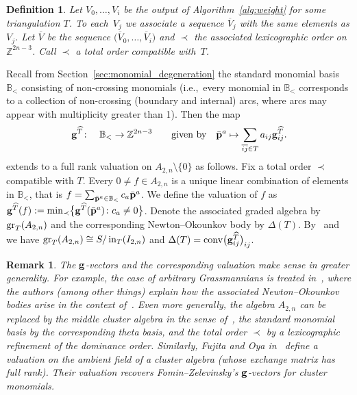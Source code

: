 \documentclass[pdftex]{sigma}%
\newtheorem{Definition}[Theorem]{Definition}
\newtheorem{Remark}[Theorem]{Remark}}
\numberwithin{equation}{section}
\DeclareMathOperator{\init}{in}
\begin{document}
\begin{Definition}
Let $V_0,\dots,V_i$ be the output of Algorithm~\ref{alg:weight} for some triangulation $T$.
To each~$V_j$ we associate a sequence $\overline{V}_j$ with the same elements as $V_j$.
Let $\overline{V}$ be the sequence $\big(\overline{V}_0,\dots,\overline{V}_i\big)$ and $\prec$ the associated lexicographic order on $\mathbb Z^{2n-3}$.
Call $\prec$ a {\it total order compatible with~$T$}.
\end{Definition}

Recall from Section~\ref{sec:monomial_degeneration} the standard monomial basis $\mathbb B_{<}$ consisting of non-crossing monomials
(i.e.,~every monomial in $\mathbb B_{<}$ corresponds to a collection of non-crossing (boundary and internal) arcs, where arcs may appear with multiplicity greater than 1).
Then the map
\begin{equation}\label{eq:g-map}
{\bf g}^{\widehat{T}}\colon\quad \mathbb B_{<} \to \mathbb Z^{2n-3} \qquad \text{given by} \quad
\bar{\bf p}^a \mapsto \sum_{\overline{ij}\in T} a_{ij}{\bf g}_{ij}^{\widehat{T}}.
\end{equation}
extends to a full rank valuation on $A_{2,n}\setminus \{0\}$ as follows.
Fix a total order $\prec$ compatible with $T$.
Every $0\neq f\in A_{2,n}$ is a unique linear combination of elements in $\mathbb B_{<}$, that is $f=\sum_{\bar{\bf p}^a\in \mathbb B_{<}}c_a\bar {\bf p}^a$. We define the valuation of $f$ as
${\bf g}^{\widehat{T}}(f):= {\rm min}_{\prec} \big\{{\bf g}^{\widehat{T}}(\bar{\bf p}^a)\colon c_a\not =0\big\}$.
Denote the associated graded algebra by ${\rm gr}_{T}(A_{2,n})$ and the corresponding Newton--Okounkov body by $\Delta(T)$.
By~\cite[Corollary~2]{B-quasival} and~ we have ${\rm gr}_T(A_{2,n})\cong S/\init_T(I_{2,n})$ and $\Delta(T)={\rm conv}\big({\bf g}^{\widehat{T}}_{ij}\big)_{ij}$.

\begin{Remark}
The ${\bf g}$-vectors and the corresponding valuation make sense in greater generality. For example, the case of arbitrary Grassmannians is treated in~\cite{BCMN}, where the authors (among other things) explain how the associated Newton--Okounkov bodies arise in the context of~\cite{GHKK}.
Even more generally, the algebra $A_{2,n}$ can be replaced by the {\it middle cluster algebra} in the sense of~\cite{GHKK}, the standard monomial basis by the corresponding {\it theta basis}, and the total order $\prec$ by a lexicographic refinement of the {\it dominance order}.
Similarly, Fujita and Oya in~\cite[Section~3]{FO20} define a valuation on the ambient field of a cluster algebra (whose exchange matrix has full rank). Their valuation recovers Fomin--Zelevinsky's ${\bf g}$-vectors for cluster monomials.
\end{Remark}
\end{document}
